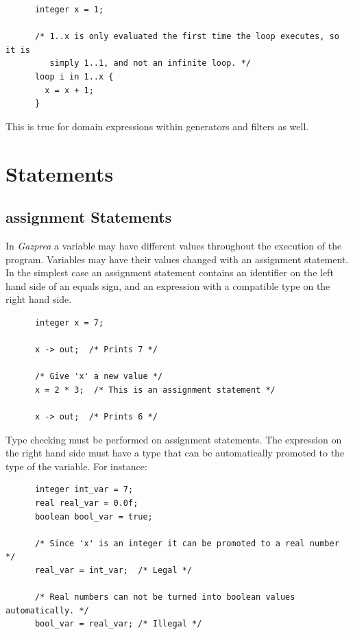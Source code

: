 \documentclass{article}
\begin{document}
    \begin{lstlisting}
      integer x = 1;

      /* 1..x is only evaluated the first time the loop executes, so it is
         simply 1..1, and not an infinite loop. */
      loop i in 1..x {
        x = x + 1;
      }
    \end{lstlisting}

    This is true for domain expressions within generators and filters as well.


\section{Statements}\label{sec:statements}

  \subsection{assignment Statements}\label{sec:assignment}

    In \textit{Gazprea} a variable may have different values throughout the execution of the program. Variables may
    have their values changed with an assignment statement. In the simplest case an assignment statement contains an
    identifier on the left hand side of an equals sign, and an expression with a compatible type on the right hand
    side.

    \begin{lstlisting}
      integer x = 7;

      x -> out;  /* Prints 7 */

      /* Give 'x' a new value */
      x = 2 * 3;  /* This is an assignment statement */

      x -> out;  /* Prints 6 */
    \end{lstlisting}

    Type checking must be performed on assignment statements. The expression on the right hand side must have a type
    that can be automatically promoted to the type of the variable. For instance:

    \begin{lstlisting}
      integer int_var = 7;
      real real_var = 0.0f;
      boolean bool_var = true;

      /* Since 'x' is an integer it can be promoted to a real number */
      real_var = int_var;  /* Legal */

      /* Real numbers can not be turned into boolean values automatically. */
      bool_var = real_var; /* Illegal */
    \end{lstlisting}
\end{document}
